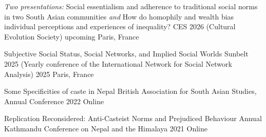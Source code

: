 

\begin{cvpresentations}




  \cvpresentation
    {\textit{Two presentations:} Social essentialism and adherence to traditional social norms in two South Asian communities \textit{and} How do homophily and wealth bias individual perceptions and experiences of inequality?} %
    {CES 2026 (Cultural Evolution Society)} %
    {upcoming} %
    {Paris, France} %


  \cvpresentation
    {Subjective Social Status, Social Networks, and Implied Social Worlds} %
    {Sunbelt 2025 (Yearly conference of the International Network for Social Network Analysis)} %
    {2025} %
    {Paris, France} %


  \cvpresentation
    {Some Specificities of caste in Nepal} %
    {British Association for South Asian Studies, Annual Conference} %
    {2022} %
    {Online} %

  \cvpresentation
    {Replication Reconsidered: Anti-Casteist Norms and Prejudiced Behaviour} %
    {Annual Kathmandu Conference on Nepal and the Himalaya} %
    {2021} %
    {Online} %

\end{cvpresentations}
